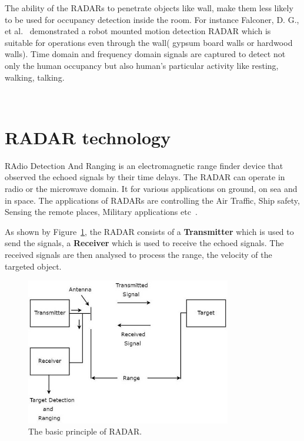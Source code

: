 The ability of the RADARs to penetrate objects like wall, make them less likely to be used for occupancy detection inside the room. For instance Falconer, D. G., et al.~\cite{falconer2000robot} demonstrated a robot mounted motion detection RADAR which is suitable for operations even through the wall( gypsum board walls or hardwood walls). Time domain and frequency domain signals are captured to detect not only the human occupancy but also human's particular activity like resting, walking, talking.



\\

\section{RADAR technology}
RAdio Detection And Ranging is an electromagnetic range finder device that observed the echoed signals by their time delays.  The RADAR can operate in radio or the microwave domain. 
It for various applications on ground, on sea and in space. The applications of RADARs are controlling the Air Traffic, Ship safety, Sensing the remote places, Military applications etc~\cite{RADAR}.

As shown by Figure~\ref{fig:basic_principle}, the RADAR consists of a \textbf{Transmitter} which is used to send the signals, a \textbf{Receiver} which is used to receive the echoed signals.
The received signals are then analysed to process the range, the velocity of the targeted object. 

\begin{figure}[ht]
  \begin{center}
    \includegraphics[width=0.80\textwidth]{Master's thesis/images/basic_principal.jpg} 
    \caption{The basic principle of RADAR.}
    \label{fig:basic_principle}
  \end{center}
\end{figure}

